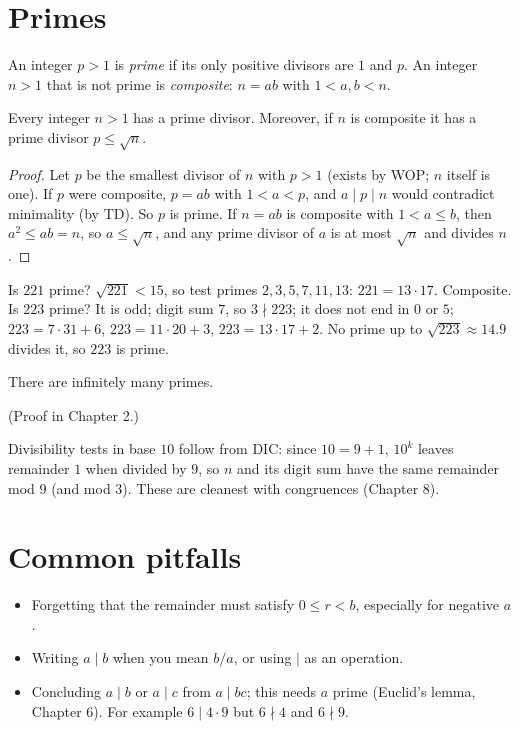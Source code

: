 \section{Primes}

\begin{definition}
An integer $p > 1$ is \emph{prime} if its only positive divisors are $1$ and $p$. An integer
$n > 1$ that is not prime is \emph{composite}: $n = ab$ with $1 < a,b < n$.
\end{definition}

\begin{proposition}
Every integer $n > 1$ has a prime divisor. Moreover, if $n$ is composite it has a prime
divisor $p \le \sqrt n$.
\end{proposition}
\begin{proof}
Let $p$ be the smallest divisor of $n$ with $p > 1$ (exists by WOP; $n$ itself is one). If $p$
were composite, $p = ab$ with $1 < a < p$, and $a \mid p \mid n$ would contradict minimality
(by TD). So $p$ is prime. If $n = ab$ is composite with $1 < a \le b$, then $a^2 \le ab = n$, so
$a \le \sqrt n$, and any prime divisor of $a$ is at most $\sqrt n$ and divides $n$.
\end{proof}

\begin{example}
Is $221$ prime? $\sqrt{221} < 15$, so test primes $2,3,5,7,11,13$: $221 = 13\cdot 17$. Composite.
Is $223$ prime? It is odd; digit sum $7$, so $3 \nmid 223$; it does not end in $0$ or $5$;
$223 = 7\cdot 31 + 6$, $223 = 11\cdot 20 + 3$, $223 = 13 \cdot 17 + 2$. No prime up to
$\sqrt{223}\approx 14.9$ divides it, so $223$ is prime.
\end{example}

\begin{theorem}[Euclid]
There are infinitely many primes.
\end{theorem}
(Proof in Chapter 2.)

\begin{aside}
Divisibility tests in base $10$ follow from DIC: since $10 = 9 + 1$, $10^k$ leaves remainder $1$
when divided by $9$, so $n$ and its digit sum have the same remainder mod $9$ (and mod $3$).
These are cleanest with congruences (Chapter 8).
\end{aside}

\section{Common pitfalls}
\begin{itemize}
  \item Forgetting that the remainder must satisfy $0\le r<b$, especially for negative $a$.
  \item Writing $a \mid b$ when you mean $b / a$, or using $\mid$ as an operation.
  \item Concluding $a \mid b$ or $a \mid c$ from $a \mid bc$; this needs $a$ prime (Euclid's lemma,
        Chapter 6). For example $6 \mid 4\cdot 9$ but $6 \nmid 4$ and $6 \nmid 9$.
\end{itemize}

